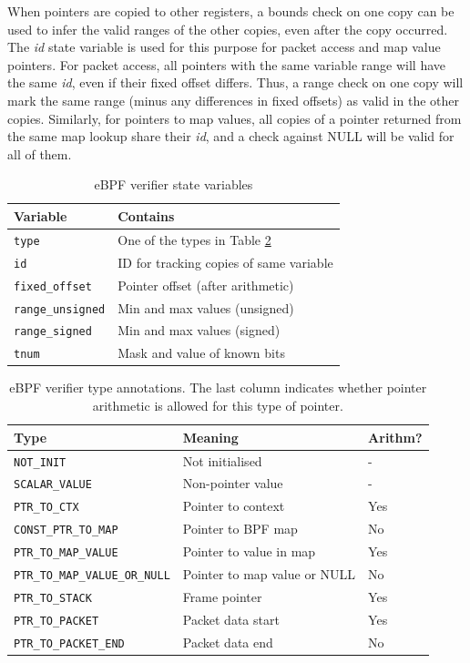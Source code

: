 \documentclass[10pt]{sig-alternate-05-2015}
\begin{document}
When pointers are copied to other registers, a bounds check on one copy can be
used to infer the valid ranges of the other copies, even after the copy
occurred. The \emph{id} state variable is used for this purpose for packet access and
map value pointers. For packet access, all pointers with the same variable
range will have the same \emph{id}, even if their fixed offset differs. Thus, a range
check on one copy will mark the same range (minus any differences in fixed
offsets) as valid in the other copies. Similarly, for pointers to map values,
all copies of a pointer returned from the same map lookup share their \emph{id}, and
a check against NULL will be valid for all of them.

\begin{table}[htbp]
\caption{\label{tbl:vrf-state-vars}
eBPF verifier state variables}
\centering
\begin{tabular}{ll}
\toprule
Variable & Contains\\
\midrule
\texttt{type} & One of the types in Table \ref{tbl:reg-types}\\
\texttt{id} & ID for tracking copies of same variable\\
\texttt{fixed\_offset} & Pointer offset (after arithmetic)\\
\texttt{range\_unsigned} & Min and max values (unsigned)\\
\texttt{range\_signed} & Min and max values (signed)\\
\texttt{tnum} & Mask and value of known bits\\
\bottomrule
\end{tabular}
\end{table}

\begin{table}[htbp]
\caption{\label{tbl:reg-types}
eBPF verifier type annotations. The last column indicates whether pointer arithmetic is allowed for this type of pointer.}
\centering
\begin{tabular}{lll}
\toprule
Type & Meaning & Arithm?\\
\midrule
\texttt{NOT\_INIT} & Not initialised & -\\
\texttt{SCALAR\_VALUE} & Non-pointer value & -\\
\texttt{PTR\_TO\_CTX} & Pointer to context & Yes\\
\texttt{CONST\_PTR\_TO\_MAP} & Pointer to BPF map & No\\
\texttt{PTR\_TO\_MAP\_VALUE} & Pointer to value in map & Yes\\
\texttt{PTR\_TO\_MAP\_VALUE\_OR\_NULL} & Pointer to map value or NULL & No\\
\texttt{PTR\_TO\_STACK} & Frame pointer & Yes\\
\texttt{PTR\_TO\_PACKET} & Packet data start & Yes\\
\texttt{PTR\_TO\_PACKET\_END} & Packet data end & No\\
\bottomrule
\end{tabular}
\end{table}
\end{document}
